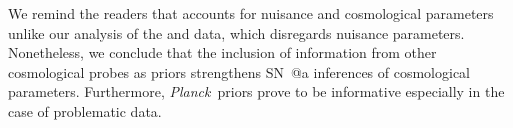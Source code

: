 \documentclass[12pt,a4paper]{article}
\makeatletter
\newcommand\Planck{{\it Planck}\ }
\newcommand*{\rom}[1]{\expandafter\@slowromancap\romannumeral #1@}
\newcommand{\sna}{\mbox{SN \rom{1}a}}
\makeatother
\begin{document}
We remind the readers that \citet{planck2013} accounts for nuisance and cosmological
parameters unlike our analysis of the \citet{betoule2014} and \citet{rest2014} data, which disregards 
nuisance parameters. Nonetheless, we conclude that the inclusion of information from other cosmological 
probes as priors strengthens {\sna} inferences of cosmological parameters. Furthermore, \Planck priors prove
to be informative especially in the case of problematic data. 


\end{document}
